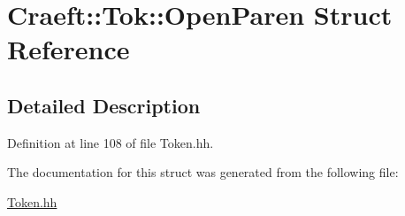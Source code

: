 \hypertarget{struct_craeft_1_1_tok_1_1_open_paren}{}\section{Craeft\+:\+:Tok\+:\+:Open\+Paren Struct Reference}
\label{struct_craeft_1_1_tok_1_1_open_paren}


\subsection{Detailed Description}


Definition at line 108 of file Token.\+hh.



The documentation for this struct was generated from the following file\+:\begin{DoxyCompactItemize}
\item 
\hyperlink{_token_8hh}{Token.\+hh}\end{DoxyCompactItemize}
